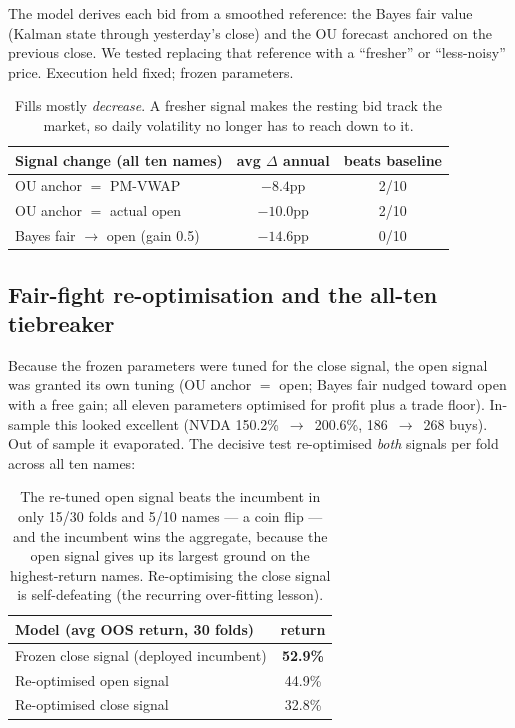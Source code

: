 \documentclass[11pt]{article}
\begin{document}
The model derives each bid from a smoothed reference: the Bayes fair value (Kalman state
through yesterday's close) and the OU forecast anchored on the previous close. We tested
replacing that reference with a ``fresher'' or ``less-noisy'' price. Execution held fixed;
frozen parameters.

\begin{table}[h]\centering\small
\renewcommand{\arraystretch}{1.15}
\begin{tabular}{lcc}
\toprule
\textbf{Signal change (all ten names)} & \textbf{avg $\Delta$ annual} & \textbf{beats baseline} \\
\midrule
OU anchor $=$ PM-VWAP        & $-8.4$pp  & 2/10 \\
OU anchor $=$ actual open    & $-10.0$pp & 2/10 \\
Bayes fair $\to$ open (gain 0.5) & $-14.6$pp & 0/10 \\
\bottomrule
\end{tabular}
\caption*{\footnotesize Fills mostly \emph{decrease}. A fresher signal makes the resting bid
track the market, so daily volatility no longer has to reach down to it.}
\end{table}

\subsection{Fair-fight re-optimisation and the all-ten tiebreaker}

Because the frozen parameters were tuned for the close signal, the open signal was granted its
own tuning (OU anchor $=$ open; Bayes fair nudged toward open with a free gain; all eleven
parameters optimised for profit plus a trade floor). In-sample this looked excellent
(NVDA 150.2\%~$\to$~200.6\%, 186~$\to$~268 buys). Out of sample it evaporated. The decisive
test re-optimised \emph{both} signals per fold across all ten names:

\begin{table}[h]\centering\small
\renewcommand{\arraystretch}{1.15}
\begin{tabular}{lc}
\toprule
\textbf{Model (avg OOS return, 30 folds)} & \textbf{return} \\
\midrule
Frozen close signal (deployed incumbent) & \textbf{52.9\%} \\
Re-optimised open signal                 & 44.9\% \\
Re-optimised close signal                & 32.8\% \\
\bottomrule
\end{tabular}
\caption*{\footnotesize The re-tuned open signal beats the incumbent in only 15/30 folds and
5/10 names --- a coin flip --- and the incumbent wins the aggregate, because the open signal
gives up its largest ground on the highest-return names. Re-optimising the close signal is
self-defeating (the recurring over-fitting lesson).}
\end{table}
\end{document}
